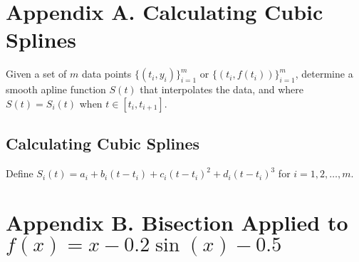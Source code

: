 \chapter*{Appendix A. Calculating Cubic Splines}

\begin{remark}[Problem]
    Given a set of \( m \) data points \( \{ (t_i, y_i) \}_{i=1}^{m} \) or \( \{ (t_i, f(t_i)) \}_{i=1}^{m} \), determine a smooth apline function \( S(t) \) that interpolates the data, and where \( S(t) = S_i(t) \) when \( t \in [t_i, t_{i+1}] \).
\end{remark}

\section*{Calculating Cubic Splines}

Define \( S_i(t) = a_i + b_i(t - t_i) + c_i(t - t_i)^2 + d_i(t - t_i)^3 \) for \( i = 1, 2, \dots, m \).

\chapter*{Appendix B. Bisection Applied to \( f(x) = x - 0.2 \sin(x) - 0.5 \)}

